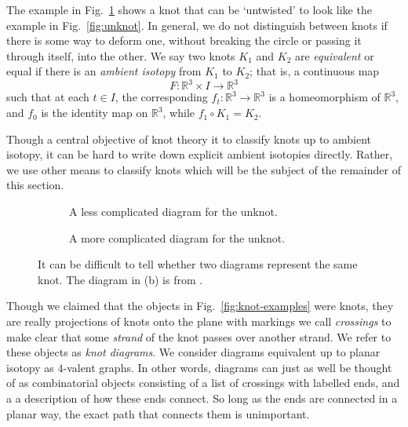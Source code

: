 \documentclass[12pt]{report}
\newcommand{\R}{\mathbb{R}}
\begin{document}
The example in Fig.~\ref{fig:unknot-twisted} shows a knot that can be `untwisted' to look like the example in Fig.~\ref{fig:unknot}. In general, we do not distinguish between knots if there is some way to deform one, without breaking the circle or passing it through itself, into the other. We say two knots $K_{1}$ and $K_{2}$ are \textit{equivalent} or equal if there is an \textit{ambient isotopy} from $K_{1}$ to $K_{2}$; that is, a continuous map
\[F: \R^{3} \times I \longrightarrow \R^{3}\]
such that at each $t \in I$, the corresponding $f_{t}: \R^{3} \longrightarrow \R^{3}$ is a homeomorphism of $\R^{3}$, and $f_{0}$ is the identity map on $\R^{3}$, while $f_{1} \circ K_{1} = K_{2}$.

Though a central objective of knot theory it to classify knots up to ambient isotopy, it can be hard to write down explicit ambient isotopies directly. Rather, we use other means to classify knots which will be the subject of the remainder of this section.

\begin{figure}[hbt]
	\centering
	\hspace*{\fill}
	\begin{subfigure}[b]{0.35 \textwidth}
		\centering
		\def\svgscale{0.2}
		
		\caption{A less complicated diagram for the unknot.}
		\label{fig:unknot-twisted}
	\end{subfigure}
	\hspace*{\fill}
	\begin{subfigure}[b]{0.35 \textwidth}
		\centering
		\def\svgscale{0.2}
		
		\caption{A more complicated diagram for the unknot.}
		\label{fig:unknot-goertiz}
	\end{subfigure}
	\hspace*{\fill}
	\caption{It can be difficult to tell whether two diagrams represent the same knot. The diagram in (b) is from \cite{notes-on-knot-theory}.}
	\label{fig:more-unknots}
\end{figure}

Though we claimed that the objects in Fig.~\ref{fig:knot-examples} were knots, they are really projections of knots onto the plane with markings we call \textit{crossings} to make clear that some \textit{strand} of the knot passes over another strand. We refer to these objects as \textit{knot diagrams}. We consider diagrams equivalent up to planar isotopy as $4$-valent graphs. In other words, diagrams can just as well be thought of as combinatorial objects consisting of a list of crossings with labelled ends, and a a description of how these ends connect. So long as the ends are connected in a planar way, the exact path that connects them is unimportant.
\end{document}
